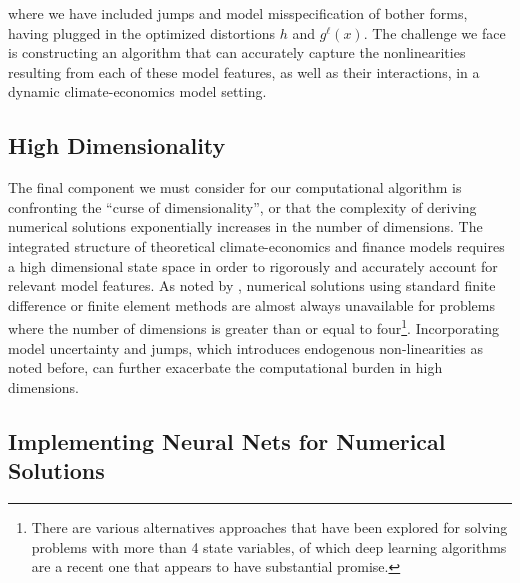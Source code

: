 \documentclass[12pt]{article}
\begin{document}
where we have included jumps and model misspecification of bother forms, having plugged in the optimized distortions $h$ and $g^{\ell}(x)$. The challenge we face is constructing an algorithm that can accurately capture the nonlinearities resulting from each of these model features, as well as their interactions, in a dynamic climate-economics model setting.

\subsection{High Dimensionality}

The final component we must consider for our computational algorithm is confronting the ``curse of dimensionality'', or that the complexity of deriving numerical solutions exponentially increases in the number of dimensions. The integrated structure of theoretical climate-economics and finance models requires a high dimensional state space in order to rigorously and accurately account for relevant model features. As noted by \cite{HaJeE:18}, numerical solutions using standard finite difference or finite element methods are almost always unavailable for problems where the number of dimensions is greater than or equal to four\footnote{There are various alternatives approaches that have been explored for solving problems with more than 4 state variables, of which deep learning algorithms are a recent one that appears to have substantial promise.}. Incorporating model uncertainty and jumps, which introduces endogenous non-linearities as noted before, can further exacerbate the computational burden in high dimensions. 


\subsection{Implementing Neural Nets for Numerical Solutions}\label{sec:DGM-PIA}
\end{document}
